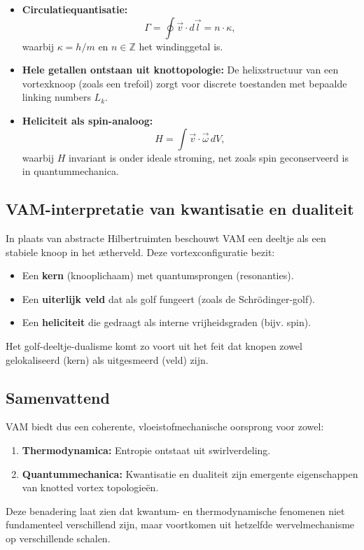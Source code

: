 \begin{itemize}
    \item \textbf{Circulatiequantisatie:}
    \begin{equation}
    \Gamma = \oint \vec{v} \cdot d\vec{l} = n \cdot \kappa,
    \end{equation}
    waarbij $\kappa = h/m$ en $n \in \mathbb{Z}$ het windinggetal is.

    \item \textbf{Hele getallen ontstaan uit knottopologie:} De helixstructuur van een vortexknoop (zoals een trefoil) zorgt voor discrete toestanden met bepaalde linking numbers $L_k$.

    \item \textbf{Heliciteit als spin-analoog:}
    \begin{equation}
    H = \int \vec{v} \cdot \vec{\omega} \, dV,
    \end{equation}
    waarbij $H$ invariant is onder ideale stroming, net zoals spin geconserveerd is in quantummechanica.
\end{itemize}

\subsection{VAM-interpretatie van kwantisatie en dualiteit}

In plaats van abstracte Hilbertruimten beschouwt VAM een deeltje als een stabiele knoop in het ætherveld. Deze vortexconfiguratie bezit:

\begin{itemize}
    \item Een \textbf{kern} (knooplichaam) met quantumsprongen (resonanties).
    \item Een \textbf{uiterlijk veld} dat als golf fungeert (zoals de Schrödinger-golf).
    \item Een \textbf{heliciteit} die gedraagt als interne vrijheidsgraden (bijv. spin).
\end{itemize}

Het golf-deeltje-dualisme komt zo voort uit het feit dat knopen zowel gelokaliseerd (kern) als uitgesmeerd (veld) zijn.

\subsection{Samenvattend}

VAM biedt dus een coherente, vloeistofmechanische oorsprong voor zowel:

\begin{enumerate}
    \item \textbf{Thermodynamica:} Entropie ontstaat uit swirlverdeling.
    \item \textbf{Quantummechanica:} Kwantisatie en dualiteit zijn emergente eigenschappen van knotted vortex topologieën.
\end{enumerate}

Deze benadering laat zien dat kwantum- en thermodynamische fenomenen niet fundamenteel verschillend zijn, maar voortkomen uit hetzelfde wervelmechanisme op verschillende schalen.

